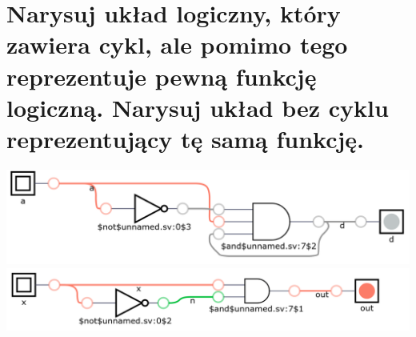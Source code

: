 \documentclass{article}
\begin{document}
\section{Narysuj układ logiczny, który zawiera cykl, ale pomimo tego reprezentuje pewną funkcję logiczną. Narysuj
układ bez cyklu reprezentujący tę samą funkcję.}
\begin{center}
	\includegraphics[scale=0.2]{./L01Z09.png}
	\includegraphics[scale=0.3]{./L01Z09czII.png}
\end{center}
 
\end{document}
